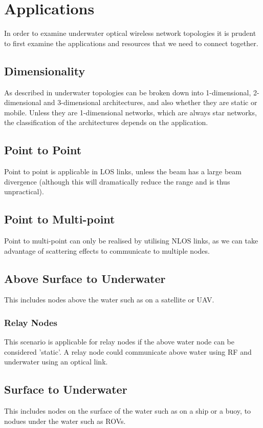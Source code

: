 \section{Applications}
In order to examine underwater optical wireless network topologies
it is prudent to first examine the applications and resources that
we need to connect together.

\subsection{Dimensionality}
As described in \cite{saeed2018underwater} underwater topologies can be broken
down into 1-dimensional, 2-dimensional and 3-dimensional architectures, and also
whether they are static or mobile. Unless they are 1-dimensional networks, which
are always star networks, the classification of the architectures depends on
the application.

\subsection{Point to Point}
Point to point is applicable in \ac{LOS} links, unless the beam has a large
beam divergence (although this will dramatically reduce the range and is
thus unpractical).

\subsection{Point to Multi-point}
Point to multi-point can only be realised by utilising \ac{NLOS} links, as
we can take advantage of scattering effects to communicate to multiple nodes.

\subsection{Above Surface to Underwater}
This includes nodes above the water such as on a satellite or \ac{UAV}.

\subsubsection{Relay Nodes}
This scenario is applicable for relay nodes if the above water node
can be considered 'static'. A relay node could communicate above water
using RF and underwater using an optical link.

\subsection{Surface to Underwater}
This includes nodes on the surface of the water such as on a ship
or a buoy, to nodues under the water such as \ac{ROV}s.

